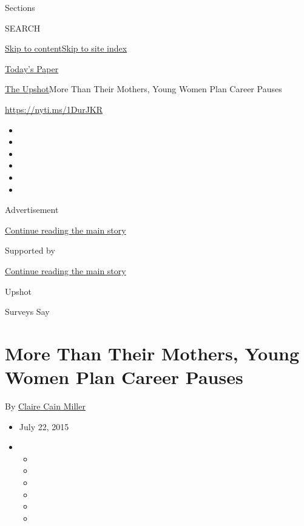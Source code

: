 Sections

SEARCH

\protect\hyperlink{site-content}{Skip to
content}\protect\hyperlink{site-index}{Skip to site index}

\href{https://myaccount.nytimes3xbfgragh.onion/auth/login?response_type=cookie\&client_id=vi}{}

\href{https://www.nytimes3xbfgragh.onion/section/todayspaper}{Today's
Paper}

\href{/section/upshot}{The Upshot}\textbar{}More Than Their Mothers,
Young Women Plan Career Pauses

\url{https://nyti.ms/1DurJKR}

\begin{itemize}
\item
\item
\item
\item
\item
\item
\end{itemize}

Advertisement

\protect\hyperlink{after-top}{Continue reading the main story}

Supported by

\protect\hyperlink{after-sponsor}{Continue reading the main story}

Upshot

Surveys Say

\hypertarget{more-than-their-mothers-young-women-plan-career-pauses}{%
\section{More Than Their Mothers, Young Women Plan Career
Pauses}\label{more-than-their-mothers-young-women-plan-career-pauses}}

By \href{http://www.nytimes3xbfgragh.onion/by/claire-cain-miller}{Claire
Cain Miller}

\begin{itemize}
\item
  July 22, 2015
\item
  \begin{itemize}
  \item
  \item
  \item
  \item
  \item
  \item
  \end{itemize}
\end{itemize}

